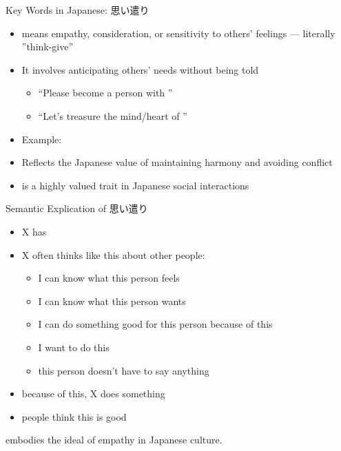 \documentclass{beamer}
\begin{document}
\begin{frame}{Key Words in Japanese: 思い遣り }
    \begin{itemize}
    \item {} means empathy, consideration, or sensitivity to others' feelings
      --- literally ''think-give''
    \item It involves anticipating others' needs without being told
      \begin{itemize}
      \item {} ``Please become a person with ''
      \item {} ``Let’s treasure the mind/heart of ''
      \end{itemize}
        \item Example: 
        \item Reflects the Japanese value of maintaining harmony and avoiding conflict
        \item {} is a highly valued trait in Japanese social interactions
    \end{itemize}
\end{frame}

\begin{frame}{Semantic Explication of 思い遣り }
  \begin{itemize}
  \item X has 
  \item X often thinks like this about other people:
    \begin{itemize}
    \item I can know what this person feels
    \item I can know what this person wants
    \item I can do something good for this person because of this
    \item I want to do this
    \item this person doesn’t have to say anything
    \end{itemize}
  \item because of this, X does something
  \item people think this is good
  \end{itemize}
\bigskip
{} embodies the ideal of empathy in Japanese culture.

\end{frame}
\end{document}
